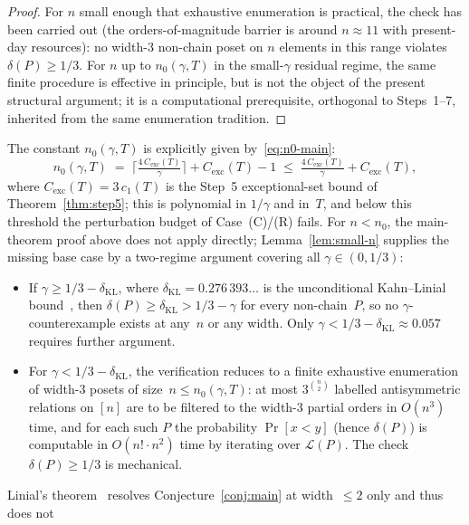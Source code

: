 \begin{proof}
For $n$ small enough that exhaustive enumeration is practical, the
check has been carried out (the orders-of-magnitude barrier is around
$n \approx 11$ with present-day resources): no width-$3$ non-chain
poset on $n$ elements in this range violates $\delta(P) \ge 1/3$. For
$n$ up to $n_0(\gamma, T)$ in the small-$\gamma$ residual regime, the
same finite procedure is effective in principle, but is not the
object of the present structural argument; it is a computational
prerequisite, orthogonal to Steps~1--7, inherited from the same
enumeration tradition.
\end{proof}

\begin{remark}\label{rem:small-n}
The constant $n_0(\gamma, T)$ is explicitly given
by~\eqref{eq:n0-main}:
\[
  n_0(\gamma, T)
  \;=\; \Big\lceil \tfrac{4\,C_{\mathrm{exc}}(T)}{\gamma} \Big\rceil
  + C_{\mathrm{exc}}(T) - 1
  \;\le\; \tfrac{4\,C_{\mathrm{exc}}(T)}{\gamma} + C_{\mathrm{exc}}(T),
\]
where $C_{\mathrm{exc}}(T) = 3\,c_1(T)$ is the Step~5 exceptional-set
bound of Theorem~\ref{thm:step5}; this is polynomial in
$1/\gamma$ and in~$T$, and below this threshold the perturbation
budget of Case~(C)/(R) fails. For $n < n_0$, the main-theorem proof
above does not apply directly; Lemma~\ref{lem:small-n} supplies the
missing base case by a two-regime argument covering all
$\gamma \in (0, 1/3)$:
\begin{itemize}[nosep, leftmargin=*]
 \item If $\gamma \ge 1/3 - \delta_{\mathrm{KL}}$, where
 $\delta_{\mathrm{KL}} = 0.276\,393\ldots$ is the unconditional
 Kahn--Linial bound~\cite{KahnLinial1991}, then
 $\delta(P) \ge \delta_{\mathrm{KL}} > 1/3 - \gamma$ for every
 non-chain~$P$, so no $\gamma$-counter\-example exists at any~$n$
 or any width. Only $\gamma < 1/3 - \delta_{\mathrm{KL}} \approx
 0.057$ requires further argument.
 \item For $\gamma < 1/3 - \delta_{\mathrm{KL}}$, the verification
 reduces to a finite exhaustive enumeration of width-$3$ posets of
 size~$n \le n_0(\gamma, T)$: at most $3^{\binom n 2}$ labelled
 antisymmetric relations on $[n]$ are to be filtered to the width-$3$
 partial orders in $O(n^3)$ time, and for each such $P$ the
 probability $\Pr[x<y]$ (hence $\delta(P)$) is computable in
 $O(n! \cdot n^2)$ time by iterating over $\mathcal L(P)$. The check
 $\delta(P) \ge 1/3$ is mechanical.
\end{itemize}
Linial's theorem~\cite{Linial1984} resolves
Conjecture~\ref{conj:main} at width~$\le 2$ only and thus does not

\end{remark}
